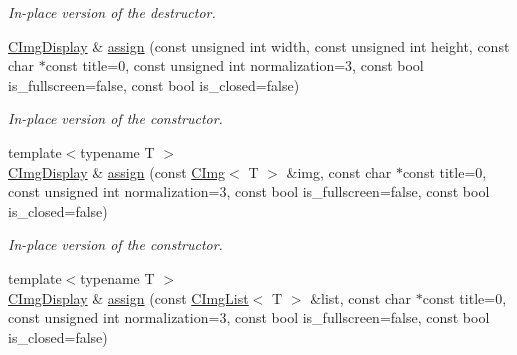 \begin{DoxyCompactItemize}
\begin{DoxyCompactList}\small\item\em In-\/place version of the destructor. \item\end{DoxyCompactList}\item 
\hypertarget{structcimg__library_1_1CImgDisplay_aa78d227523af633336bcf25ec00e0384}{
\hyperlink{structcimg__library_1_1CImgDisplay}{CImgDisplay} \& \hyperlink{structcimg__library_1_1CImgDisplay_aa78d227523af633336bcf25ec00e0384}{assign} (const unsigned int width, const unsigned int height, const char $\ast$const title=0, const unsigned int normalization=3, const bool is\_\-fullscreen=false, const bool is\_\-closed=false)}
\label{structcimg__library_1_1CImgDisplay_aa78d227523af633336bcf25ec00e0384}

\begin{DoxyCompactList}\small\item\em In-\/place version of the constructor. \item\end{DoxyCompactList}\item 
\hypertarget{structcimg__library_1_1CImgDisplay_a0ba9bc27cc704ef439f6433b23f894a3}{
{\footnotesize template$<$typename T $>$ }\\\hyperlink{structcimg__library_1_1CImgDisplay}{CImgDisplay} \& \hyperlink{structcimg__library_1_1CImgDisplay_a0ba9bc27cc704ef439f6433b23f894a3}{assign} (const \hyperlink{structcimg__library_1_1CImg}{CImg}$<$ T $>$ \&img, const char $\ast$const title=0, const unsigned int normalization=3, const bool is\_\-fullscreen=false, const bool is\_\-closed=false)}
\label{structcimg__library_1_1CImgDisplay_a0ba9bc27cc704ef439f6433b23f894a3}

\begin{DoxyCompactList}\small\item\em In-\/place version of the constructor. \item\end{DoxyCompactList}\item 
\hypertarget{structcimg__library_1_1CImgDisplay_a94ee7ecdd108db45e8c76e5bc116d912}{
{\footnotesize template$<$typename T $>$ }\\\hyperlink{structcimg__library_1_1CImgDisplay}{CImgDisplay} \& \hyperlink{structcimg__library_1_1CImgDisplay_a94ee7ecdd108db45e8c76e5bc116d912}{assign} (const \hyperlink{structcimg__library_1_1CImgList}{CImgList}$<$ T $>$ \&list, const char $\ast$const title=0, const unsigned int normalization=3, const bool is\_\-fullscreen=false, const bool is\_\-closed=false)}
\label{structcimg__library_1_1CImgDisplay_a94ee7ecdd108db45e8c76e5bc116d912}


\end{DoxyCompactItemize}
